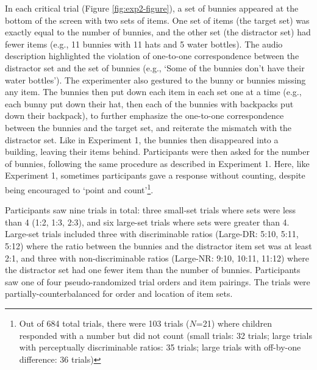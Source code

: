 \documentclass[
  man,floatsintext]{apa7}
\begin{document}
In each critical trial (Figure \ref{fig:exp2-figure}), a set of bunnies appeared at the bottom of the screen with two sets of items. One set of items (the target set) was exactly equal to the number of bunnies, and the other set (the distractor set) had fewer items (e.g., 11 bunnies with 11 hats and 5 water bottles). The audio description highlighted the violation of one-to-one correspondence between the distractor set and the set of bunnies (e.g., `Some of the bunnies don't have their water bottles'). The experimenter also gestured to the bunny or bunnies missing any item. The bunnies then put down each item in each set one at a time (e.g., each bunny put down their hat, then each of the bunnies with backpacks put down their backpack), to further emphasize the one-to-one correspondence between the bunnies and the target set, and reiterate the mismatch with the distractor set. Like in Experiment 1, the bunnies then disappeared into a building, leaving their items behind. Participants were then asked for the number of bunnies, following the same procedure as described in Experiment 1. Here, like Experiment 1, sometimes participants gave a response without counting, despite being encouraged to `point and count'\footnote{Out of 684 total trials, there were 103 trials (\(N\)=21) where children responded with a number but did not count (small trials: 32 trials; large trials with perceptually discriminable ratios: 35 trials; large trials with off-by-one difference: 36 trials)}.

Participants saw nine trials in total: three small-set trials where sets were less than 4 (1:2, 1:3, 2:3), and six large-set trials where sets were greater than 4. Large-set trials included three with discriminable ratios (Large-DR: 5:10, 5:11, 5:12) where the ratio between the bunnies and the distractor item set was at least 2:1, and three with non-discriminable ratios (Large-NR: 9:10, 10:11, 11:12) where the distractor set had one fewer item than the number of bunnies. Participants saw one of four pseudo-randomized trial orders and item pairings. The trials were partially-counterbalanced for order and location of item sets.
\end{document}
